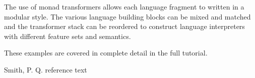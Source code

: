 \documentclass[natbib,10pt]{sigplanconf}
\begin{document}
The use of monad transformers allows each language fragment to written
in a modular style.  The various language building blocks can be mixed
and matched and the transformer stack can be reordered to construct
language interpreters with different feature sets and semantics.

These examples are covered in complete detail in the full tutorial.







\begin{thebibliography}{}

Smith, P. Q. reference text

\end{thebibliography}
\end{document}
